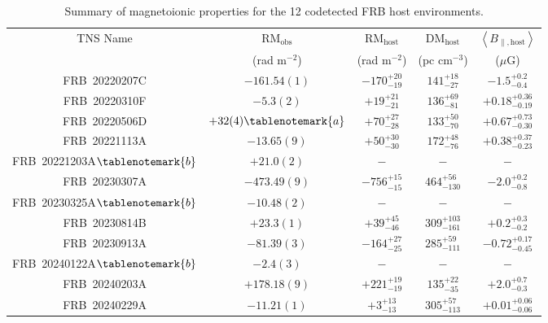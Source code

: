 \documentclass[twocolumn, linenumbers]{aastex701}
\begin{document}
\setlength{\tabcolsep}{0.08pt}
\setlength\extrarowheight{2pt}
\setlength{\LTcapwidth}{1.0\textwidth}
\begin{table}[ht!]
\begin{center}
\caption{Summary of magnetoionic properties for the 12 codetected FRB host environments.} \label{tb:host_props}
\begin{tabular}{ccccc}
\hline
\hline
TNS Name & $\mathrm{RM}_\mathrm{obs}$ & $\mathrm{RM}_\mathrm{host}$ & $\mathrm{DM}_\mathrm{host}$ & $\left<B_{\parallel,\mathrm{host}}\right>$\\
 & (rad m$^{-2}$) & (rad m$^{-2}$) & (pc cm$^{-3}$) & ($\mu$G)\\
\hline
FRB~20220207C & $-161.54(1)$ & $-170^{+20}_{-19}$ & $141^{+18}_{-27}$ & $-1.5^{+0.2}_{-0.4}$\\
FRB~20220310F & $-5.3(2)$ & $+19^{+21}_{-21}$ & $136^{+69}_{-81}$ & $+0.18^{+0.36}_{-0.19}$\\
FRB~20220506D & $+32(4)\tablenotemark{a}$ & $+70^{+27}_{-28}$ & $133^{+50}_{-70}$ & $+0.67^{+0.73}_{-0.30}$\\
FRB~20221113A & $-13.65(9)$ & $+50^{+30}_{-30}$ & $172^{+48}_{-76}$ & $+0.38^{+0.37}_{-0.23}$\\
FRB~20221203A$\tablenotemark{b}$ & $+21.0(2)$ & $-$ & $-$ & $-$\\
FRB~20230307A & $-473.49(9)$ & $-756^{+15}_{-15}$ & $464^{+56}_{-130}$ & $-2.0^{+0.2}_{-0.8}$\\
FRB~20230325A$\tablenotemark{b}$ & $-10.48(2)$ & $-$ & $-$  & $-$\\
FRB~20230814B & $+23.3(1)$ & $+39^{+45}_{-46}$ & $309^{+103}_{-161}$ & $+0.2^{+0.3}_{-0.2}$\\
FRB~20230913A & $-81.39(3)$ & $-164^{+27}_{-25}$ & $285^{+59}_{-111}$ & $-0.72^{+0.17}_{-0.45}$\\
FRB~20240122A$\tablenotemark{b}$ & $-2.4(3)$ & $-$ & $-$ & $-$\\
FRB~20240203A & $+178.18(9)$ & $+221^{+19}_{-19}$ & $135^{+22}_{-35}$ & $+2.0^{+0.7}_{-0.3}$\\
FRB~20240229A & $-11.21(1)$ & $+3^{+13}_{-13}$ & $305^{+57}_{-113}$ & $+0.01^{+0.06}_{-0.06}$\\
\hline
\hline
\end{tabular}
\end{center}
\end{table}
\end{document}
